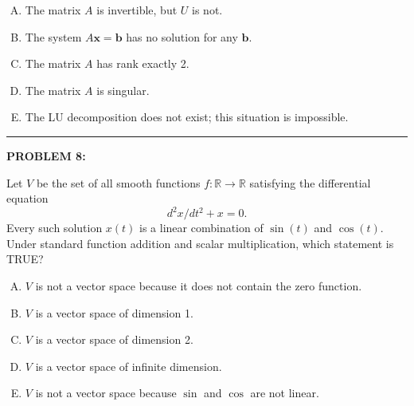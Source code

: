 \documentclass[12pt]{amsart}
\newcommand{\divider}{
  \vspace{-1em} %
  \noindent
  \raisebox{-0.15ex}{\textbullet}%
  \hspace{0.5em}%
  \rule[0.5ex]{0.95\textwidth}{1.0pt}%
  \hspace{0.5em}%
  \raisebox{-0.15ex}{\textbullet}%
  \vspace{0em} %
}
\begin{document}
\begin{enumerate}[(A)]
\item The matrix $A$ is invertible, but $U$ is not.
\item The system $A\mathbf{x} = \mathbf{b}$ has no solution for any $\mathbf{b}$.
\item The matrix $A$ has rank exactly 2.
\item The matrix $A$ is singular.
\item The LU decomposition does not exist; this situation is impossible.
\end{enumerate}


\divider

{\bf PROBLEM 8:}

Let $V$ be the set of all smooth functions $f: \mathbb{R} \to \mathbb{R}$ satisfying the differential equation $$d^2x/dt^2 + x = 0.$$ Every such solution $x(t)$ is a linear combination of $\sin(t)$ and $\cos(t)$. Under standard function addition and scalar multiplication, which statement is TRUE?

\begin{enumerate}[(A)]
\item $V$ is not a vector space because it does not contain the zero function.
\item $V$ is a vector space of dimension 1.
\item $V$ is a vector space of dimension 2.
\item $V$ is a vector space of infinite dimension.
\item $V$ is not a vector space because $\sin$ and $\cos$ are not linear.
\end{enumerate}
\end{document}
